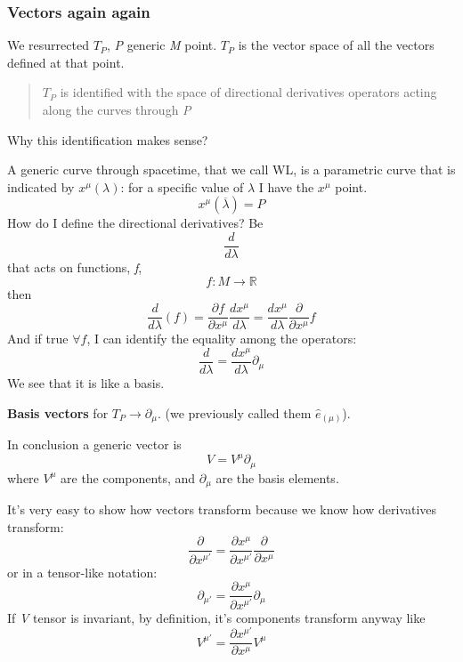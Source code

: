 \subsubsection{Vectors again again}
We resurrected $T_{P}$, \emph{P} generic \emph{M} point. $T_{P}$ is the vector space of all the vectors defined at that point.
\begin{quote}
$T_{P}$ is identified with the space of directional derivatives operators acting along the curves through \emph{P}
\end{quote}
Why this identification makes sense?\par
A generic curve through spacetime, that we call WL, is a parametric curve that is indicated by $x^{\mu }\left( \lambda  \right)$: for a specific value of $\lambda $ I have the $x^{\mu }$ point.
\[
x^{\mu }\left( \overline{\lambda } \right) = P
\]
How do I define the directional derivatives?
Be \[
\frac{d}{d\lambda }
\]
that acts on functions, \emph{f},
\[
f : M \to \mathbb{R}
\]
then
\begin{equation}
\frac{d}{d\lambda } \left( f \right) = \frac{\partial f}{\partial x^{\mu }} \frac{d x^{\mu }}{d \lambda } = \frac{dx^{\mu }}{d\lambda } \frac{\partial}{\partial x^{\mu }} f
\end{equation}
And if true $\forall f$, I can identify the equality among the operators:
\[
\frac{d}{d\lambda } = \frac{dx^{\mu }}{d\lambda }\partial_{\mu }
\]
We see that it is like a basis.\par
\textbf{Basis vectors } for $T_{P}\to \partial_{\mu }$. (we previously called them $\hat{e}_{\left( \mu  \right)}$). \par
In conclusion a generic vector is 
\[
V = V^{\mu }\partial_{\mu }
\]
where $V^{\mu }$ are the components, and $\partial_{\mu }$ are the basis elements.\par

It's very easy to show how vectors transform because we know how derivatives transform:
\begin{equation}
\frac{\partial}{\partial  x^{\mu'}} = \frac{\partial  x^{\mu }}{\partial  x^{\mu '}} \frac{\partial}{\partial  x^{\mu }}
\end{equation}
or in a tensor-like notation:
\begin{equation}
\partial_{\mu '} = \frac{\partial  x^{\mu }}{\partial x^{\mu '}} \partial_{\mu }
\end{equation}
If \emph{V} tensor is invariant, by definition, it's components transform anyway like
\[
V^{\mu '} = \frac{\partial x^{\mu '}}{\partial x^{\mu }}V^{\mu }
\]

